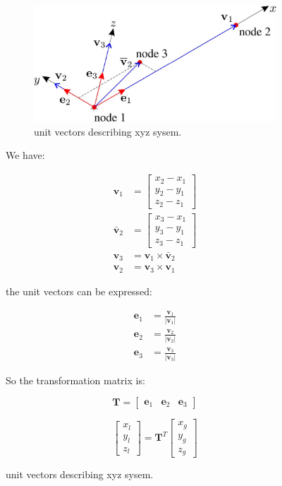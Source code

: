 \begin{figure}[h!]
\begin{figure}[h!]
\centering
\includegraphics[width=0.5\linewidth]{figure/unit_vectors_for_transformation}
\caption{unit vectors describing xyz sysem.}
\label{fig: unit vectors for transformation}
\end{figure}

We have:

\begin{align*}
	\mathbf{v}_1 &= \begin{bmatrix}
		x_2-x_1 \\ 
		y_2-y_1 \\ 
		z_2-z_1
		\end{bmatrix} \\
		 \bar{\mathbf{v}}_2 &= \begin{bmatrix}
		x_3-x_1 \\ 
		y_3-y_1 \\ 
		z_3-z_1 
	\end{bmatrix} \\
	 \mathbf{v}_3 &= \mathbf{v}_1 \times \bar{\mathbf{v}}_2 \\
	 \mathbf{v}_2 &= \mathbf{v}_3 \times \mathbf{v}_1
\end{align*}

the unit vectors can be expressed:

\begin{align*}
	\mathbf{e}_1 &= \frac{\mathbf{v}_1}{|\mathbf{v}_1|} \\
	\mathbf{e}_2 &= \frac{\mathbf{v}_2}{|\mathbf{v}_2|} \\
	\mathbf{e}_3 &= \frac{\mathbf{v}_3}{|\mathbf{v}_3|}
\end{align*}

So the transformation matrix is:

\begin{equation}
\mathbf{T} = \begin{bmatrix}
\mathbf{e}_1 & \mathbf{e}_2 & \mathbf{e}_3
\end{bmatrix} 
\end{equation}

\begin{equation}
\begin{bmatrix}
x_l \\ 
y_l \\ 
z_l
\end{bmatrix} = \mathbf{T}^T \begin{bmatrix}
x_g \\ 
y_g \\ 
z_g
\end{bmatrix} 
\end{equation}


\end{figure}
